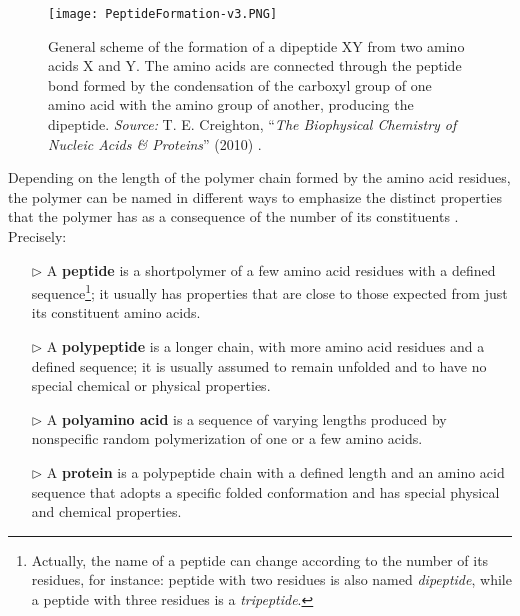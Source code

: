 
\begin{figure}[h]
\centering
\begin{minipage}[t]{\textwidth}
\centering
\texttt{[image: PeptideFormation-v3.PNG]}

\caption{\small{General scheme of the formation of a dipeptide XY from two amino acids X and Y. The amino acids are connected through the peptide bond formed by the condensation of the carboxyl group of one amino acid with the amino group of another, producing the dipeptide. 
    \textit{Source:} T. E. Creighton, ``\textit{The Biophysical Chemistry of Nucleic Acids \& Proteins}'' (2010) 
    \cite{creighton2010biophysical}.}
}


\label{fig:PeptideFormation}
\end{minipage} 
\end{figure}

Depending on the length of the polymer chain formed by the amino acid residues, the polymer can be named in different ways to emphasize the distinct properties that the polymer has as a consequence of the number of its constituents
\cite{creighton2010biophysical}.
Precisely:
\begin{itemize}
\item[$\triangleright$] A \textbf{peptide} is a shortpolymer of a few amino acid residues with a defined sequence\footnote{Actually, the name of a peptide can change according to the number of its residues, for instance: peptide with two residues is also named \textit{dipeptide}, while a peptide with three residues is a \textit{tripeptide}.}; it usually has properties that are close to those expected from just its constituent amino acids.
\item[$\triangleright$] A \textbf{polypeptide} is a longer chain, with more amino acid residues and a defined sequence; it is usually assumed to remain unfolded and to have no special chemical or physical properties. 
\item[$\triangleright$] A \textbf{polyamino acid} is a sequence of varying lengths produced by nonspecific random polymerization of one or a few amino acids.
\item[$\triangleright$] A \textbf{protein} is a polypeptide chain with a defined length and an amino acid sequence that adopts a specific folded conformation and has special physical and chemical properties.
\end{itemize}

